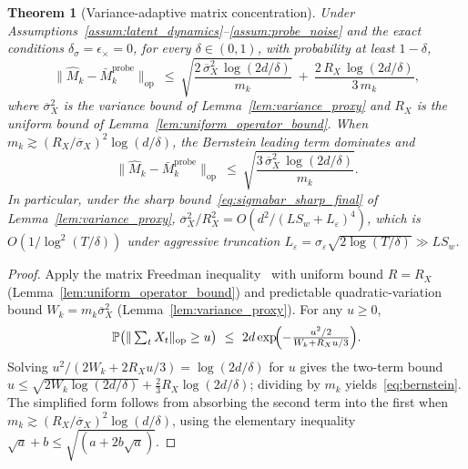 \documentclass[11pt]{article}
\newcommand{\Prob}{\mathbb{P}}
\newcommand{\op}{\mathrm{op}}
\newtheorem{theorem}{Theorem}
\begin{document}
\begin{theorem}[Variance-adaptive matrix concentration]
\label{thm:variance_adaptive_concentration}
Under Assumptions~\ref{assum:latent_dynamics}--\ref{assum:probe_noise} and
the exact conditions $\delta_\sigma=\epsilon_\times=0$, for every
$\delta\in(0,1)$, with probability at least $1-\delta$,
\begin{equation}
  \bigl\|\widehat M_k-\bar M_k^{\mathrm{probe}}\bigr\|_{\op}
  \ \le\ \sqrt{\frac{2\,\overline{\sigma}_X^2\,\log(2d/\delta)}{m_k}}
  \ +\ \frac{2\,R_X\,\log(2d/\delta)}{3\,m_k},
  \label{eq:bernstein}
\end{equation}
where $\overline{\sigma}_X^2$ is the variance bound of
Lemma~\ref{lem:variance_proxy} and $R_X$ is the uniform bound of
Lemma~\ref{lem:uniform_operator_bound}.
When $m_k\gtrsim(R_X/\overline{\sigma}_X)^2\log(d/\delta)$, the Bernstein
leading term dominates and
\[
  \bigl\|\widehat M_k-\bar M_k^{\mathrm{probe}}\bigr\|_{\op}
  \ \le\ \sqrt{\frac{3\,\overline{\sigma}_X^2\,\log(2d/\delta)}{m_k}}.
\]
In particular, under the sharp bound~\eqref{eq:sigmabar_sharp_final} of
Lemma~\ref{lem:variance_proxy},
$\overline{\sigma}_X^2/R_X^2 = O(d^2/(LS_w+L_\varepsilon)^4)$, which is
$O(1/\log^2(T/\delta))$ under aggressive truncation
$L_\varepsilon=\sigma_\varepsilon\sqrt{2\log(T/\delta)}\gg LS_w$.
\end{theorem}

\begin{proof}
Apply the matrix Freedman inequality~\citep{tropp2012user} with uniform
bound $R=R_X$ (Lemma~\ref{lem:uniform_operator_bound}) and predictable
quadratic-variation bound $W_k=m_k\overline{\sigma}_X^2$
(Lemma~\ref{lem:variance_proxy}).  For any $u\ge 0$,
\[
  \Prob\bigl(\|\textstyle\sum_t X_t\|_{\op}\ge u\bigr)
  \ \le\ 2d\exp\!\Bigl(-\frac{u^2/2}{W_k+R_X u/3}\Bigr).
\]
Solving $u^2/(2W_k+2R_Xu/3)=\log(2d/\delta)$ for $u$ gives the two-term
bound
$u\le\sqrt{2W_k\log(2d/\delta)}+\tfrac{2}{3}R_X\log(2d/\delta)$;
dividing by $m_k$ yields~\eqref{eq:bernstein}.  The simplified form follows
from absorbing the second term into the first when
$m_k\gtrsim(R_X/\overline{\sigma}_X)^2\log(d/\delta)$, using the elementary
inequality $\sqrt{a}+b\le\sqrt{(a+2b\sqrt a)}$.
\end{proof}
\end{document}
